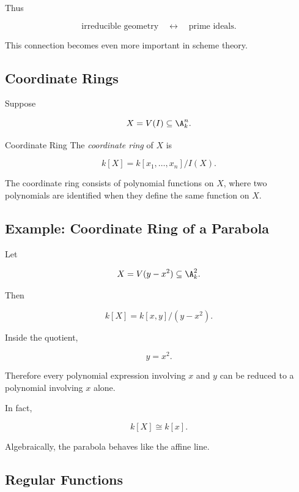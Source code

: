 Thus

\[
\boxed{
\text{irreducible geometry}
\quad\longleftrightarrow\quad
\text{prime ideals}.
}
\]

This connection becomes even more important in scheme theory.

\subsection{Coordinate Rings}
\label{subsec:coordinate-rings}

Suppose

\[
X=V(I)\subseteq\A^n_k.
\]

\begin{definitionbox}{Coordinate Ring}
The \emph{coordinate ring} of \(X\) is

\[
\boxed{
k[X]
=
k[x_1,\ldots,x_n]/I(X).
}
\]
\end{definitionbox}

The coordinate ring consists of polynomial functions on \(X\), where two
polynomials are identified when they define the same function on \(X\).

\subsection{Example: Coordinate Ring of a Parabola}
\label{subsec:coordinate-ring-parabola}

Let

\[
X=V(y-x^2)\subseteq\A^2_k.
\]

Then

\[
\boxed{
k[X]
=
k[x,y]/(y-x^2).
}
\]

Inside the quotient,

\[
y=x^2.
\]

Therefore every polynomial expression involving \(x\) and \(y\) can be
reduced to a polynomial involving \(x\) alone.

In fact,

\[
\boxed{
k[X]\cong k[x].
}
\]

Algebraically, the parabola behaves like the affine line.

\subsection{Regular Functions}
\label{subsec:regular-functions}

